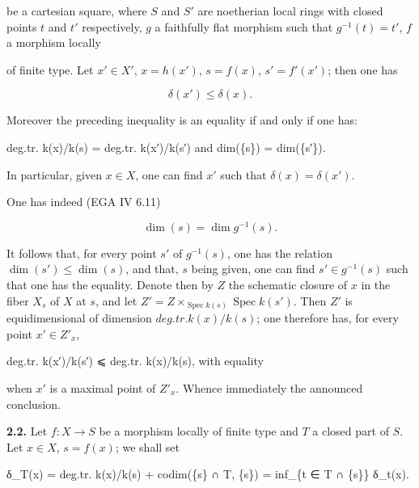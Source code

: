 \documentclass[
]{article}
\newenvironment{Shaded}{}{}
\newcommand{\NormalTok}[1]{#1}
\begin{document}
be a cartesian square, where \(S\) and \(S'\) are noetherian local rings
with closed points \(t\) and \(t'\) respectively, \(g\) a faithfully
flat morphism such that \(g^{-1}(t) = t'\), \(f\) a morphism locally

of finite type. Let \(x' \in X'\), \(x = h(x')\), \(s = f(x)\),
\(s' = f'(x')\); then one has

\[
\delta(x') \leqslant \delta(x).
\]

Moreover the preceding inequality is an equality if and only if one has:

\begin{Shaded}
\begin{Highlighting}[]
\NormalTok{deg.tr. k(x)/k(s) = deg.tr. k(x′)/k(s′)   and   dim(\{s\}) = dim(\{s′\}).}
\end{Highlighting}
\end{Shaded}

In particular, given \(x \in X\), one can find \(x'\) such that
\(\delta(x) = \delta(x')\).

One has indeed (EGA IV 6.11)

\[
\dim({s}) = \dim g^{-1}({s}).
\]

It follows that, for every point \(s'\) of \(g^{-1}(s)\), one has the
relation \(\dim({s'}) \leqslant \dim({s})\), and that, \(s\) being
given, one can find \(s' \in g^{-1}(s)\) such that one has the equality.
Denote then by \(Z\) the schematic closure of \(x\) in the fiber
\(X_{s}\) of \(X\) at \(s\), and let
\(Z' = Z \times_{\operatorname{Spec} k(s)} \operatorname{Spec} k(s')\).
Then \(Z'\) is equidimensional of dimension \(deg.tr. k(x)/k(s)\); one
therefore has, for every point \(x' \in Z'_{x}\),

\begin{Shaded}
\begin{Highlighting}[]
\NormalTok{deg.tr. k(x′)/k(s′) ⩽ deg.tr. k(x)/k(s),  with equality}
\end{Highlighting}
\end{Shaded}

when \(x'\) is a maximal point of \(Z'_{x}\). Whence immediately the
announced conclusion.

\textbf{2.2.} Let \(f : X \to S\) be a morphism locally of finite type
and \(T\) a closed part of \(S\). Let \(x \in X\), \(s = f(x)\); we
shall set

\begin{Shaded}
\begin{Highlighting}[]
\NormalTok{δ\_T(x) = deg.tr. k(x)/k(s) + codim(\{s\} ∩ T, \{s\}) = inf\_\{t ∈ T ∩ \{s\}\} δ\_t(x).}
\end{Highlighting}
\end{Shaded}
\end{document}
